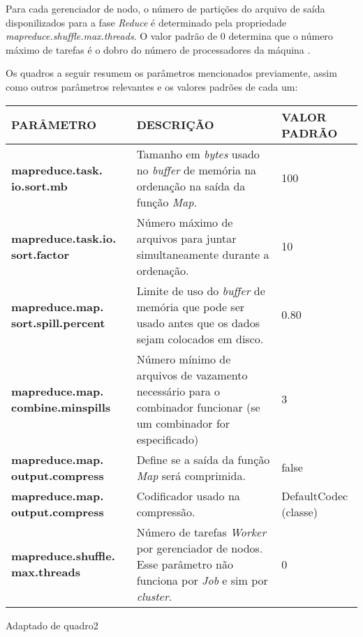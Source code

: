 Para cada gerenciador de nodo, o número de partições do arquivo de saída disponilizados para a fase \textit{Reduce} é determinado pela propriedade \textit{mapreduce.shuffle.max.threads}. O valor padrão de 0 determina que o número máximo de tarefas é o dobro do número de processadores da máquina \cite{ProHadoop09}.

Os quadros a seguir resumem os parâmetros mencionados previamente, assim como outros parâmetros relevantes e os valores padrões de cada um:

{\footnotesize
  \centering
  \begin{tabular}{|p{30mm}|p{50mm}|p{35mm}|}\hline
    \textbf{PARÂMETRO}                         & \textbf{DESCRIÇÃO}                                                                                                                   & \textbf{VALOR PADRÃO} \\\hline
    \textbf{mapreduce.task. io.sort.mb}        & Tamanho em \textit{bytes} usado no \textit{buffer} de memória na ordenação na saída da função \textit{Map}.                          & 100                   \\\hline
    \textbf{mapreduce.task.io. sort.factor}    & Número máximo de arquivos para juntar simultaneamente durante a ordenação.                                                           & 10                    \\\hline
    \textbf{mapreduce.map. sort.spill.percent} & Limite de uso do \textit{buffer} de memória que pode ser usado antes que os dados sejam colocados em disco.                          & 0.80                  \\\hline
    \textbf{mapreduce.map. combine.minspills}  & Número mínimo de arquivos de vazamento necessário para o combinador funcionar (se um combinador for especificado)                    & 3                     \\\hline
    \textbf{mapreduce.map. output.compress}    & Define se a saída da função \textit{Map} será comprimida.                                                                            & false                 \\\hline
    \textbf{mapreduce.map. output.compress}    & Codificador usado na compressão.                                                                                                     & DefaultCodec (classe) \\\hline
    \textbf{mapreduce.shuffle. max.threads}    & Número de tarefas \textit{Worker} por gerenciador de nodos. Esse parâmetro não funciona por \textit{Job} e sim por \textit{cluster}. & 0                     \\\hline
  \end{tabular}}
{Adaptado de \cite{HadoopBook15}}{quadro2}{}{}

